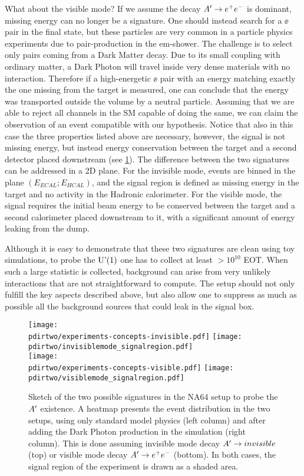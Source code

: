 What about the visible mode? If we assume the decay $A' \to e^+e^-$ is dominant, missing energy can no longer be a signature. One should instead search for a $\ee$ pair in the final state, but these particles are very common in a particle physics experiments due to pair-production in the em-shower. The challenge is to select only pairs coming from a Dark Matter decay. Due to its small coupling with ordinary matter, a Dark Photon will travel inside very dense materials with no interaction. Therefore if a high-energetic $\ee$ pair with an energy matching exactly the one missing from the target is measured, one can conclude that the energy was transported outside the volume by a neutral particle. Assuming that we are able to reject all channels in the SM capable of doing the same, we can claim the observation of an event compatible with our hypothesis. Notice that also in this case the three properties listed above are necessary, however, the signal is not missing energy, but instead energy conservation between the target and a second detector placed downstream (see \ref{fig:two-signature}).
The difference between the two signatures can be addressed in a 2D plane. For the invisible mode, events are binned in the plane $(E_{ECAL};E_{HCAL})$, and the signal region is defined as missing energy in the target and no activity in the Hadronic calorimeter. For the visible mode, the signal requires the initial beam energy to be conserved between the target and a second calorimeter placed downstream to it, with a significant amount of energy leaking from the dump.

Although it is easy to demonstrate that these two signatures are clean using toy simulations, to probe the $\textrm{U'(1)}$ one has to collect at least $>10^{10}$ EOT. When such a large statistic is collected, background can arise from very unlikely interactions that are not straightforward to compute. The setup should not only fulfill the key aspects described above, but also allow one to suppress as much as possible all the background sources that could leak in the signal box.

\begin{figure}[bth!]
  \centering
  \texttt{[image: \\pdirtwo/experiments-concepts-invisible.pdf]}
  \texttt{[image: \\pdirtwo/invisiblemode\_signalregion.pdf]} \\
  \texttt{[image: \\pdirtwo/experiments-concepts-visible.pdf]}
  \texttt{[image: \\pdirtwo/visiblemode\_signalregion.pdf]}   
\caption[Sketch of experimental signatures for $\DM$]{Sketch of the two possible signatures in the NA64 setup to probe the $\DM$ existence. A heatmap presents the event distribution in the two setups, using only standard model physics (left column) and after adding the Dark Photon production in the simulation (right column). This is done assuming invisible mode decay $A'\to invisible$ (top) or visible mode decay $A' \to e^+e^-$ (bottom). In both cases, the signal region of the experiment is drawn as a shaded area.}
\label{fig:two-signature}
\end{figure}

